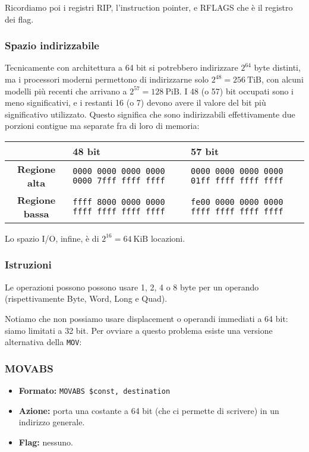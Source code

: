 \documentclass[a4paper,11pt]{article}
\begin{document}
Ricordiamo poi i registri RIP, l'instruction pointer, e RFLAGS che è il registro dei flag.

\subsubsection{Spazio indirizzabile}
Tecnicamente con architettura a 64 bit si potrebbero indirizzare $2^{64}$ byte distinti, ma i processori moderni permettono di indirizzarne solo $2^{48} = 256 \ \mathrm{TiB}$, con alcuni modelli più recenti che arrivano a $2^{57}= 128 \ \mathrm{PiB}$.
I 48 (o 57) bit occupati sono i meno significativi, e i restanti 16 (o 7) devono avere il valore del bit più significativo utilizzato.
Questo significa che sono indirizzabili effettivamente due porzioni contigue ma separate fra di loro di memoria:
\begin{table}[h!]
	\center {}
	\begin{tabular} { c | p{4cm} | p{4cm} }
		& \bfseries 48 bit & \bfseries 57 bit \\
		\hline
		\bfseries Regione alta & \texttt{0000 0000 0000 0000} \texttt{0000 7fff ffff ffff} & \texttt{0000 0000 0000 0000} \texttt{01ff ffff ffff ffff} \\
		\bfseries Regione bassa & \texttt{ffff 8000 0000 0000} \texttt{ffff ffff ffff ffff} & \texttt{fe00 0000 0000 0000} \texttt{ffff ffff ffff ffff} \\
	\end{tabular}
\end{table}

Lo spazio I/O, infine, è di $2^{16} = 64 \ \mathrm{KiB}$ locazioni.

\subsubsection{Istruzioni}
Le operazioni possono possono usare 1, 2, 4 o 8 byte per un operando (rispettivamente Byte, Word, Long e Quad).

Notiamo che non possiamo usare displacement o operandi immediati a 64 bit: siamo limitati a 32 bit.
Per ovviare a questo problema esiste una versione alternativa della \lstinline|MOV|:

\subsubsection{MOVABS}
\begin{itemize}
	\item \textbf{Formato:} \lstinline|MOVABS $const, destination|
	\item \textbf{Azione:} porta una costante a 64 bit (che ci permette di scrivere) in un indirizzo generale.
	\item \textbf{Flag:} nessuno.
\end{itemize}
\end{document}
